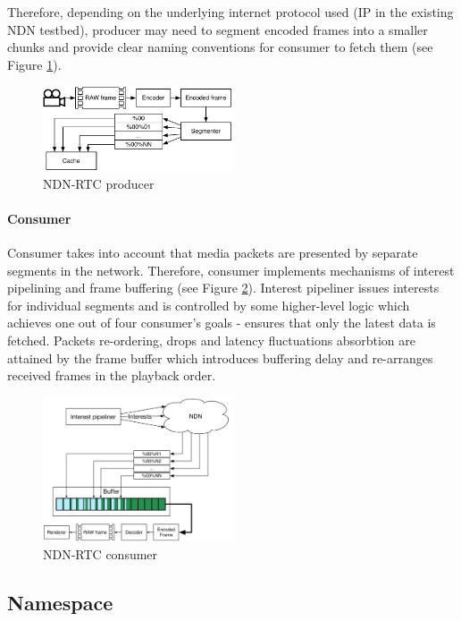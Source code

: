\documentclass[10pt]{proc}
\begin{document}
Therefore, depending on the underlying internet protocol used (IP in the existing NDN testbed), producer may need to segment encoded frames into a smaller chunks and provide clear naming conventions for consumer to fetch them (see Figure \ref{fig:producer}).

\begin{figure}[t!]
\centering
\includegraphics[width=0.5\textwidth]{producer}
\caption{NDN-RTC producer}
\label{fig:producer}
\end{figure}

\paragraph{Consumer}

Consumer takes into account that media packets are presented by separate segments in the network. Therefore, consumer implements mechanisms of interest pipelining and frame buffering (see Figure \ref{fig:consumer}). Interest pipeliner issues interests for individual segments and is controlled by some higher-level logic which achieves one out of four consumer's goals - ensures that only the latest data is fetched. Packets re-ordering, drops and latency fluctuations absorbtion are attained by the frame buffer which introduces buffering delay and re-arranges received frames in the playback order.

\begin{figure}[t!]
\centering
\includegraphics[width=0.5\textwidth]{consumer}
\caption{NDN-RTC consumer}
\label{fig:consumer}
\end{figure}


\subsection{Namespace}
\end{document}

